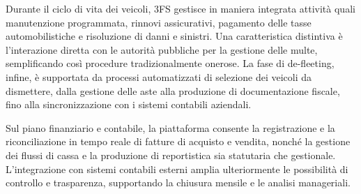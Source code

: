 Durante il ciclo di vita dei veicoli, 3FS gestisce in maniera integrata attività quali manutenzione programmata, rinnovi assicurativi, 
pagamento delle tasse automobilistiche e risoluzione di danni e sinistri. Una caratteristica distintiva è l'interazione diretta con le autorità 
pubbliche per la gestione delle multe, semplificando così procedure tradizionalmente onerose. La fase di de-fleeting, infine, è supportata 
da processi automatizzati di selezione dei veicoli da dismettere, dalla gestione delle aste alla produzione di documentazione fiscale, fino 
alla sincronizzazione con i sistemi contabili aziendali.

Sul piano finanziario e contabile, la piattaforma consente la registrazione e la riconciliazione in tempo reale di fatture di acquisto e vendita, 
nonché la gestione dei flussi di cassa e la produzione di reportistica sia statutaria che gestionale. L'integrazione con sistemi contabili esterni 
amplia ulteriormente le possibilità di controllo e trasparenza, supportando la chiusura mensile e le analisi manageriali. \cite{progesoftware_3fs}